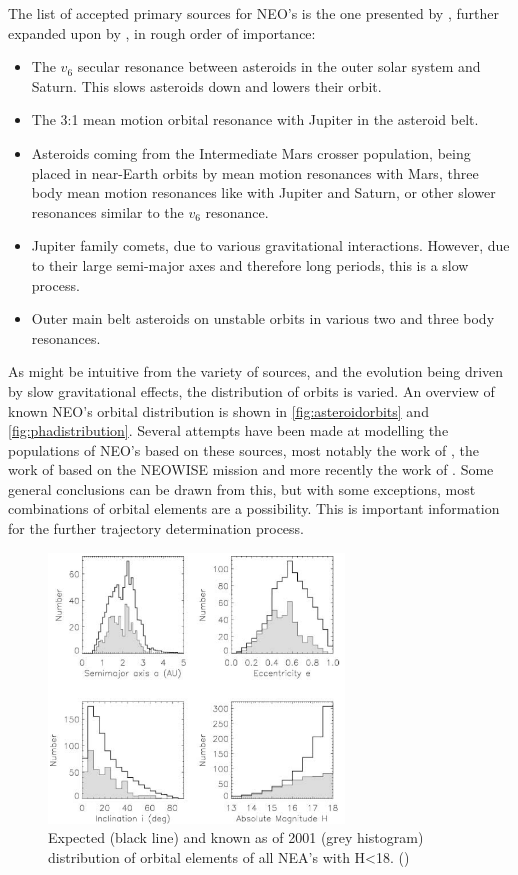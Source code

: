 The list of accepted primary sources for NEO's is the one presented by \cite{debiased}, further expanded upon by \cite{originandevolution}, in rough order of importance: 
\begin{itemize}
    \item The $v_6$ secular resonance between asteroids in the outer solar system and Saturn. This slows asteroids down and lowers their orbit.
    \item The 3:1 mean motion orbital resonance with Jupiter in the asteroid belt.
    \item Asteroids coming from the Intermediate Mars crosser population, being placed in near-Earth orbits by mean motion resonances with Mars, three body mean motion resonances like with Jupiter and Saturn, or other slower resonances similar to the $v_6$ resonance.
    \item Jupiter family comets, due to various gravitational interactions. However, due to their large semi-major axes and therefore long periods, this is a slow process.
    \item Outer main belt asteroids on unstable orbits in various two and three body resonances.
\end{itemize}

As might be intuitive from the variety of sources, and the evolution being driven by slow gravitational effects, the distribution of orbits is varied. An overview of known NEO's orbital distribution is shown in \autoref{fig:asteroidorbits} and \autoref{fig:phadistribution}.
Several attempts have been made at modelling the populations of NEO's based on these sources, most notably the work of \cite{debiased}, the work of \cite{subpopulations} based on the NEOWISE mission and more recently the work of \cite{neonieuw}. Some general conclusions can be drawn from this, but with some exceptions, most combinations of orbital elements are a possibility. This is important information for the further trajectory determination process.

\newpage
\begin{figure}[htb]
    \centering
    \includegraphics[width=0.7\textwidth]{images/neodist.png}
    \caption{Expected (black line) and known as of 2001 (grey histogram) distribution of orbital elements of all NEA's with H<18. (\cite{debiased})}
    \label{fig:phadistribution}
\end{figure}


